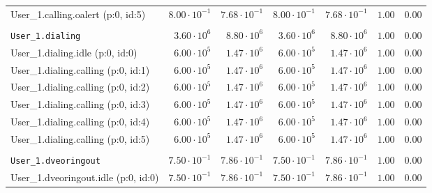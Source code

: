 \begin{table}[htbp]
{\begin{tabular}{lrrrrrr}
\hspace{3mm}User\_1.calling.oalert (p:0, id:5)        & $8.00 \cdot 10^{-1}$ & $7.68 \cdot 10^{-1}$ & $8.00 \cdot 10^{-1}$ & $7.68 \cdot 10^{-1}$ &               $1.00$ &               $0.00$ \\
\\[-8pt]\texttt{User\_1.dialing}                      &  $3.60 \cdot 10^{6}$ &  $8.80 \cdot 10^{6}$ &  $3.60 \cdot 10^{6}$ &  $8.80 \cdot 10^{6}$ &               $1.00$ &               $0.00$ \\
\hspace{3mm}User\_1.dialing.idle (p:0, id:0)          &  $6.00 \cdot 10^{5}$ &  $1.47 \cdot 10^{6}$ &  $6.00 \cdot 10^{5}$ &  $1.47 \cdot 10^{6}$ &               $1.00$ &               $0.00$ \\
\hspace{3mm}User\_1.dialing.calling (p:0, id:1)       &  $6.00 \cdot 10^{5}$ &  $1.47 \cdot 10^{6}$ &  $6.00 \cdot 10^{5}$ &  $1.47 \cdot 10^{6}$ &               $1.00$ &               $0.00$ \\
\hspace{3mm}User\_1.dialing.calling (p:0, id:2)       &  $6.00 \cdot 10^{5}$ &  $1.47 \cdot 10^{6}$ &  $6.00 \cdot 10^{5}$ &  $1.47 \cdot 10^{6}$ &               $1.00$ &               $0.00$ \\
\hspace{3mm}User\_1.dialing.calling (p:0, id:3)       &  $6.00 \cdot 10^{5}$ &  $1.47 \cdot 10^{6}$ &  $6.00 \cdot 10^{5}$ &  $1.47 \cdot 10^{6}$ &               $1.00$ &               $0.00$ \\
\hspace{3mm}User\_1.dialing.calling (p:0, id:4)       &  $6.00 \cdot 10^{5}$ &  $1.47 \cdot 10^{6}$ &  $6.00 \cdot 10^{5}$ &  $1.47 \cdot 10^{6}$ &               $1.00$ &               $0.00$ \\
\hspace{3mm}User\_1.dialing.calling (p:0, id:5)       &  $6.00 \cdot 10^{5}$ &  $1.47 \cdot 10^{6}$ &  $6.00 \cdot 10^{5}$ &  $1.47 \cdot 10^{6}$ &               $1.00$ &               $0.00$ \\
\\[-8pt]\texttt{User\_1.dveoringout}                  & $7.50 \cdot 10^{-1}$ & $7.86 \cdot 10^{-1}$ & $7.50 \cdot 10^{-1}$ & $7.86 \cdot 10^{-1}$ &               $1.00$ &               $0.00$ \\
\hspace{3mm}User\_1.dveoringout.idle (p:0, id:0)      & $7.50 \cdot 10^{-1}$ & $7.86 \cdot 10^{-1}$ & $7.50 \cdot 10^{-1}$ & $7.86 \cdot 10^{-1}$ &               $1.00$ &               $0.00$ \\

\end{tabular}}
\end{table}
